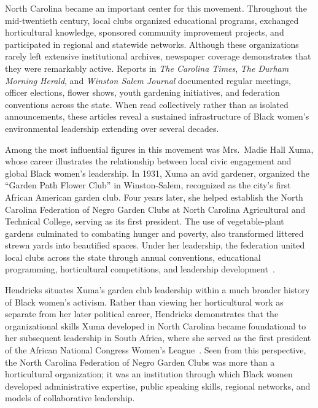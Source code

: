 \documentclass[final]{anthology-ch}
\begin{document}
North Carolina became an important center for this movement. Throughout the mid-twentieth century, local clubs organized educational programs, exchanged horticultural knowledge, sponsored community improvement projects, and participated in regional and statewide networks. Although these organizations rarely left extensive institutional archives, newspaper coverage demonstrates that they were remarkably active. Reports in \textit{The Carolina Times}, \textit{The Durham Morning Herald}, and \textit{Winston Salem Journal} documented regular meetings, officer elections, flower shows, youth gardening initiatives, and federation conventions across the state. When read collectively rather than as isolated announcements, these articles reveal a sustained infrastructure of Black women's environmental leadership extending over several decades.

Among the most influential figures in this movement was Mrs.\ Madie Hall Xuma, whose career illustrates the relationship between local civic engagement and global Black women's leadership. In 1931, Xuma an avid gardener, organized the \enquote{Garden Path Flower Club} in Winston-Salem, recognized as the city's first African American garden club. Four years later, she helped establish the North Carolina Federation of Negro Garden Clubs at North Carolina Agricultural and Technical College, serving as its first president. The use of vegetable-plant gardens culminated to combating hunger and poverty, also transformed littered strewn yards into beautified spaces. Under her leadership, the federation united local clubs across the state through annual conventions, educational programming, horticultural competitions, and leadership development~\cite[p.~72]{hendricks2022life}.

Hendricks situates Xuma's garden club leadership within a much broader history of Black women's activism. Rather than viewing her horticultural work as separate from her later political career, Hendricks demonstrates that the organizational skills Xuma developed in North Carolina became foundational to her subsequent leadership in South Africa, where she served as the first president of the African National Congress Women's League~\cite[p.~136]{hendricks2022life}. Seen from this perspective, the North Carolina Federation of Negro Garden Clubs was more than a horticultural organization; it was an institution through which Black women developed administrative expertise, public speaking skills, regional networks, and models of collaborative leadership.
\end{document}
